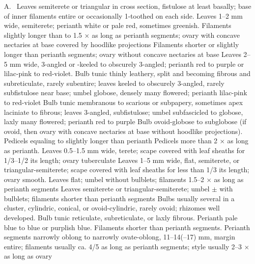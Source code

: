 \documentclass{ctexart}
\begin{document}
\begin{Key*}{A.~}
\alter Leaves semiterete or triangular in cross section, fistulose at least basally; base of inner filaments entire or occasionally 1-toothed on each side.
\alter Leaves 1--2 mm wide, semiterete; perianth white or pale red, sometimes greenish.
\alter Filaments slightly longer than to 1.5 × as long as perianth segments; ovary with concave nectaries at base covered by hoodlike projections
\alter Filaments shorter or slightly longer than perianth segments; ovary without concave nectaries at base
\alter Leaves 2--5 mm wide, 3-angled or -keeled to obscurely 3-angled; perianth red to purple or lilac-pink to red-violet.
\alter Bulb tunic thinly leathery, split and becoming fibrous and subreticulate, rarely subentire; leaves keeled to obscurely 3-angled, rarely subfistulose near base; umbel globose, densely many flowered; perianth lilac-pink to red-violet
\alter Bulb tunic membranous to scarious or subpapery, sometimes apex laciniate to fibrous; leaves 3-angled, subfistulose; umbel subfascicled to globose, laxly many flowered; perianth red to purple
\alter Bulb ovoid-globose to subglobose (if ovoid, then ovary with concave nectaries at base without hoodlike projections).
\alter Pedicels equaling to slightly longer than perianth
\alter Pedicels more than 2 × as long as perianth.
\alter Leaves 0.5--1.5 mm wide, terete; scape covered with leaf sheaths for 1/3--1/2 its length; ovary tuberculate
\alter Leaves 1--5 mm wide, flat, semiterete, or triangular-semiterete; scape covered with leaf sheaths for less than 1/3 its length; ovary smooth.
\alter Leaves flat; umbel without bulblets; filaments 1.5--2 × as long as perianth segments
\alter Leaves semiterete or triangular-semiterete; umbel $\pm$ with bulblets; filaments shorter than perianth segments
\alter Bulbs usually several in a cluster, cylindric, conical, or ovoid-cylindric, rarely ovoid; rhizomes well developed.
\alter Bulb tunic reticulate, subreticulate, or laxly fibrous.
\alter Perianth pale blue to blue or purplish blue.
\alter Filaments shorter than perianth segments.
\alter Perianth segments narrowly oblong to narrowly ovate-oblong, 11--14(--17) mm, margin entire; filaments usually ca. 4/5 as long as perianth segments; style usually 2--3 × as long as ovary

\end{Key*}
\end{document}
